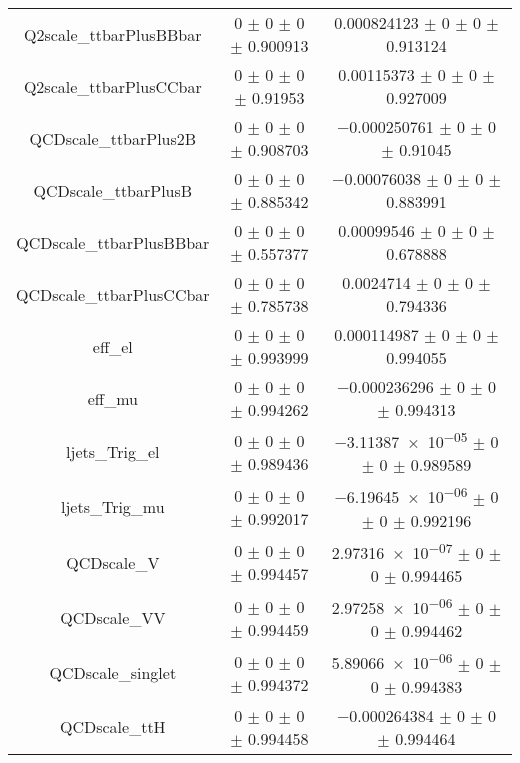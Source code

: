 \begin{table}
\begin{tabular}{ccc}
Q2scale\_ttbarPlusBBbar & \num{0} $\pm$ \num{0} $\pm$ \num{0} $\pm$ \num{0.900913} & \num{0.000824123} $\pm$ \num{0} $\pm$ \num{0} $\pm$ \num{0.913124}\\
Q2scale\_ttbarPlusCCbar & \num{0} $\pm$ \num{0} $\pm$ \num{0} $\pm$ \num{0.91953} & \num{0.00115373} $\pm$ \num{0} $\pm$ \num{0} $\pm$ \num{0.927009}\\
QCDscale\_ttbarPlus2B & \num{0} $\pm$ \num{0} $\pm$ \num{0} $\pm$ \num{0.908703} & \num{-0.000250761} $\pm$ \num{0} $\pm$ \num{0} $\pm$ \num{0.91045}\\
QCDscale\_ttbarPlusB & \num{0} $\pm$ \num{0} $\pm$ \num{0} $\pm$ \num{0.885342} & \num{-0.00076038} $\pm$ \num{0} $\pm$ \num{0} $\pm$ \num{0.883991}\\
QCDscale\_ttbarPlusBBbar & \num{0} $\pm$ \num{0} $\pm$ \num{0} $\pm$ \num{0.557377} & \num{0.00099546} $\pm$ \num{0} $\pm$ \num{0} $\pm$ \num{0.678888}\\
QCDscale\_ttbarPlusCCbar & \num{0} $\pm$ \num{0} $\pm$ \num{0} $\pm$ \num{0.785738} & \num{0.0024714} $\pm$ \num{0} $\pm$ \num{0} $\pm$ \num{0.794336}\\
eff\_el & \num{0} $\pm$ \num{0} $\pm$ \num{0} $\pm$ \num{0.993999} & \num{0.000114987} $\pm$ \num{0} $\pm$ \num{0} $\pm$ \num{0.994055}\\
eff\_mu & \num{0} $\pm$ \num{0} $\pm$ \num{0} $\pm$ \num{0.994262} & \num{-0.000236296} $\pm$ \num{0} $\pm$ \num{0} $\pm$ \num{0.994313}\\
ljets\_Trig\_el & \num{0} $\pm$ \num{0} $\pm$ \num{0} $\pm$ \num{0.989436} & \num{-3.11387e-05} $\pm$ \num{0} $\pm$ \num{0} $\pm$ \num{0.989589}\\
ljets\_Trig\_mu & \num{0} $\pm$ \num{0} $\pm$ \num{0} $\pm$ \num{0.992017} & \num{-6.19645e-06} $\pm$ \num{0} $\pm$ \num{0} $\pm$ \num{0.992196}\\
QCDscale\_V & \num{0} $\pm$ \num{0} $\pm$ \num{0} $\pm$ \num{0.994457} & \num{2.97316e-07} $\pm$ \num{0} $\pm$ \num{0} $\pm$ \num{0.994465}\\
QCDscale\_VV & \num{0} $\pm$ \num{0} $\pm$ \num{0} $\pm$ \num{0.994459} & \num{2.97258e-06} $\pm$ \num{0} $\pm$ \num{0} $\pm$ \num{0.994462}\\
QCDscale\_singlet & \num{0} $\pm$ \num{0} $\pm$ \num{0} $\pm$ \num{0.994372} & \num{5.89066e-06} $\pm$ \num{0} $\pm$ \num{0} $\pm$ \num{0.994383}\\
QCDscale\_ttH & \num{0} $\pm$ \num{0} $\pm$ \num{0} $\pm$ \num{0.994458} & \num{-0.000264384} $\pm$ \num{0} $\pm$ \num{0} $\pm$ \num{0.994464}\\

\end{tabular}
\end{table}

